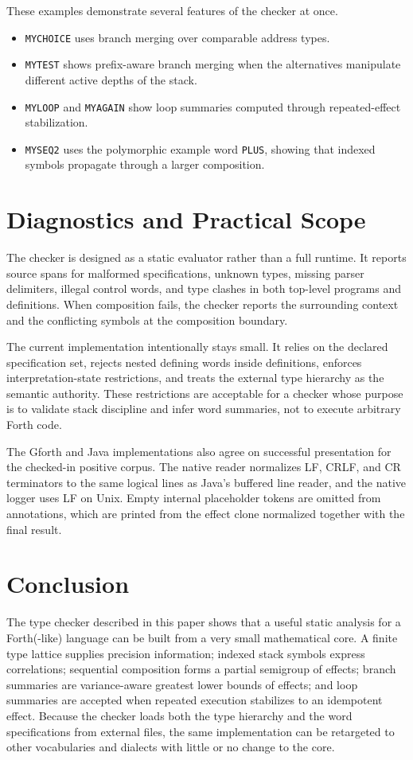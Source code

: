 \documentclass[11pt]{article}
\begin{document}
These examples demonstrate several features of the checker at once.
\begin{itemize}
\item \texttt{MYCHOICE} uses branch merging over comparable address types.
\item \texttt{MYTEST} shows prefix-aware branch merging when the alternatives manipulate different active depths of the stack.
\item \texttt{MYLOOP} and \texttt{MYAGAIN} show loop summaries computed through repeated-effect stabilization.
\item \texttt{MYSEQ2} uses the polymorphic example word \texttt{PLUS}, showing that indexed symbols propagate through a larger composition.
\end{itemize}

\section{Diagnostics and Practical Scope}
The checker is designed as a static evaluator rather than a full runtime. It reports source spans for malformed specifications, unknown types, missing parser delimiters, illegal control words, and type clashes in both top-level programs and definitions. When composition fails, the checker reports the surrounding context and the conflicting symbols at the composition boundary.

The current implementation intentionally stays small. It relies on the declared specification set, rejects nested defining words inside definitions, enforces interpretation-state restrictions, and treats the external type hierarchy as the semantic authority. These restrictions are acceptable for a checker whose purpose is to validate stack discipline and infer word summaries, not to execute arbitrary Forth code.

The Gforth and Java implementations also agree on successful presentation for
the checked-in positive corpus. The native reader normalizes LF, CRLF, and CR
terminators to the same logical lines as Java's buffered line reader, and the
native logger uses LF on Unix. Empty internal placeholder tokens are omitted
from annotations, which are printed from the effect clone normalized together
with the final result.

\section{Conclusion}
The type checker described in this paper shows that a useful static analysis for a Forth(-like) language can be built from a very small mathematical core. A finite type lattice supplies precision information; indexed stack symbols express correlations; sequential composition forms a partial semigroup of effects; branch summaries are variance-aware greatest lower bounds of effects; and loop summaries are accepted when repeated execution stabilizes to an idempotent effect. Because the checker loads both the type hierarchy and the word specifications from external files, the same implementation can be retargeted to other vocabularies and dialects with little or no change to the core.
\end{document}
